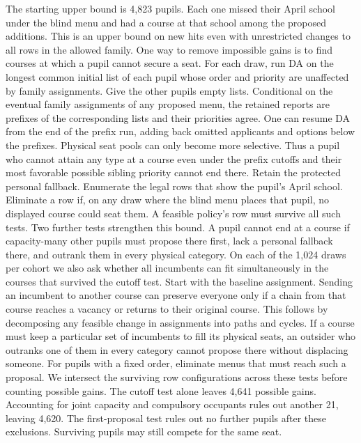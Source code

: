 The starting upper bound is 4,823 pupils. Each one missed their April school under the blind menu and had a course at that school among the proposed additions. This is an upper bound on new hits even with unrestricted changes to all rows in the allowed family. One way to remove impossible gains is to find courses at which a pupil cannot secure a seat. For each draw, run DA on the longest common initial list of each pupil whose order and priority are unaffected by family assignments. Give the other pupils empty lists. Conditional on the eventual family assignments of any proposed menu, the retained reports are prefixes of the corresponding lists and their priorities agree. One can resume DA from the end of the prefix run, adding back omitted applicants and options below the prefixes. Physical seat pools can only become more selective. Thus a pupil who cannot attain any type at a course even under the prefix cutoffs and their most favorable possible sibling priority cannot end there. Retain the protected personal fallback. Enumerate the legal rows that show the pupil's April school. Eliminate a row if, on any draw where the blind menu places that pupil, no displayed course could seat them. A feasible policy's row must survive all such tests. Two further tests strengthen this bound. A pupil cannot end at a course if capacity-many other pupils must propose there first, lack a personal fallback there, and outrank them in every physical category. On each of the 1,024 draws per cohort we also ask whether all incumbents can fit simultaneously in the courses that survived the cutoff test. Start with the baseline assignment. Sending an incumbent to another course can preserve everyone only if a chain from that course reaches a vacancy or returns to their original course. This follows by decomposing any feasible change in assignments into paths and cycles. If a course must keep a particular set of incumbents to fill its physical seats, an outsider who outranks one of them in every category cannot propose there without displacing someone. For pupils with a fixed order, eliminate menus that must reach such a proposal. We intersect the surviving row configurations across these tests before counting possible gains. The cutoff test alone leaves 4,641 possible gains. Accounting for joint capacity and compulsory occupants rules out another 21, leaving 4,620. The first-proposal test rules out no further pupils after these exclusions. Surviving pupils may still compete for the same seat.

